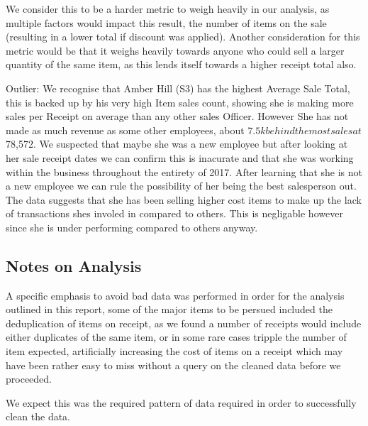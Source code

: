 \documentclass{article}
\begin{document}
            We consider this to be a harder metric to weigh heavily in our analysis,
            as multiple factors would impact this result, the number of items on the sale
            (resulting in a lower total if discount was applied). Another consideration 
            for this metric would be that it weighs heavily towards anyone who could
            sell a larger quantity of the same item, as this lends itself towards a higher
            receipt total also. 
			
			\par
			Outlier: We recognise that Amber Hill (S3) has the highest Average Sale Total, this is backed up by his very high 
			Item sales count, showing she is making more sales per Receipt on average than any other sales Officer. However She has not made as much revenue as 
			some other employees, about $7.5k behind the most sales at $78,572. We suspected that maybe she was a new employee but after looking at her
			sale receipt dates we can confirm this is inacurate and that she was working within the business throughout the entirety of 2017. After learning that she 
			is not a new employee we can rule the possibility of her being the best salesperson out. The data suggests that she has been selling higher cost items to make up 
			the lack of transactions shes involed in compared to others. This is negligable however since she is under performing compared to others anyway. 
			
        \subsection{Notes on Analysis}
            A specific emphasis to avoid bad data was performed in order for the analysis 
            outlined in this report, some of the major items to be persued included 
            the deduplication of items on receipt, as we found a number of receipts would include
            either duplicates of the same item, or in some rare cases tripple the number
            of item expected, artificially increasing the cost of items on a receipt 
            which may have been rather easy to miss without a query on the cleaned data 
            before we proceeded.
            \par
            We expect this was the required pattern of data required in order to successfully 
            clean the data.
			
\end{document}
